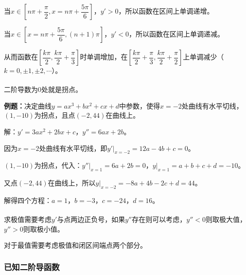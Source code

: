 当$x\in\left[n\pi+\dfrac{\pi}{2},x=n\pi+\dfrac{5\pi}{6}\right]$，$y'>0$，所以函数在区间上单调递增。

当$x\in\left[x=n\pi+\dfrac{5\pi}{6},(n+1)\pi\right]$，$y'<0$，所以函数在区间上单调递减。

从而函数在$\left[\dfrac{k\pi}{2},\dfrac{k\pi}{2}+\dfrac{\pi}{3}\right]$时单调增加，在$\left[\dfrac{k\pi}{2}+\dfrac{\pi}{3},\dfrac{k\pi}{2}+\dfrac{\pi}{2}\right]$上单调减少（$k=0,\pm 1,\pm2,\cdots$）。

\paragraph{}

二阶导数为0处就是拐点。

\textbf{例题：}决定曲线$y=ax^3+bx^2+cx+d$中参数，使得$x=-2$处曲线有水平切线，$(1,-10)$为拐点，且点$(-2,44)$在曲线上。

解：$y'=3ax^2+2bx+c$，$y''=6ax+2b$。

因为$x=-2$处曲线有水平切线，即$y'\vert_{x=-2}=12a-4b+c=0$。

$(1,-10)$为拐点，代入：$y''\vert_{x=1}=6a+2b=0$，$y\vert_{x=1}=a+b+c+d=-10$。

又点$(-2,44)$在曲线上，所以$y\vert_{x=-2}=-8a+4b-2c+d=44$。

解得四个方程：$a=1$，$b=-3$，$c=-24$，$d=16$。

\paragraph{}

求极值需要考虑$y'$与点两边正负号，如果$y''$存在则可以考虑，$y''<0$则取极大值，$y''>0$则取极小值。

对于最值需要考虑极值和闭区间端点两个部分。

\paragraph{}

\paragraph{}

\subsubsection{已知二阶导函数}

